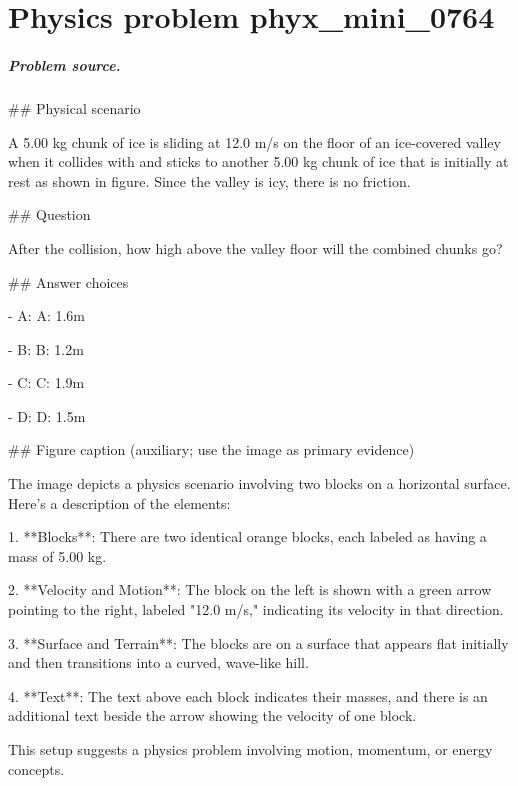 
\chapter{Physics problem phyx\_mini\_0764}
\label{ch:PhyXMiniProblems_problem_phyx_mini_0764}

\paragraph{Problem source.}
\#\# Physical scenario

A 5.00 kg chunk of ice is sliding at 12.0 m/s on the floor of an ice-covered valley when it collides with and sticks to another 5.00 kg chunk of ice that is initially at rest as shown in figure. Since the valley is icy, there is no friction.

\#\# Question

After the collision, how high above the valley floor will the combined chunks go?

\#\# Answer choices

- A: A: 1.6m

- B: B: 1.2m

- C: C: 1.9m

- D: D: 1.5m

\#\# Figure caption (auxiliary; use the image as primary evidence)

The image depicts a physics scenario involving two blocks on a horizontal surface. Here's a description of the elements:

1. **Blocks**: There are two identical orange blocks, each labeled as having a mass of 5.00 kg.

2. **Velocity and Motion**: The block on the left is shown with a green arrow pointing to the right, labeled "12.0 m/s," indicating its velocity in that direction.

3. **Surface and Terrain**: The blocks are on a surface that appears flat initially and then transitions into a curved, wave-like hill.

4. **Text**: The text above each block indicates their masses, and there is an additional text beside the arrow showing the velocity of one block.

This setup suggests a physics problem involving motion, momentum, or energy concepts.

